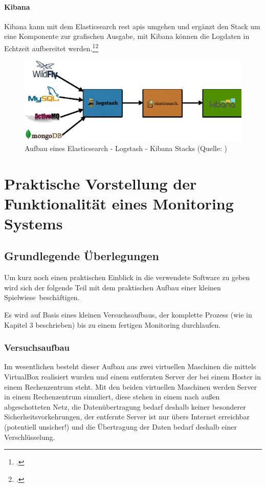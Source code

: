 \documentclass[12pt,a4paper,parskip,listof=totoc,bibliography=totoc]{scrreprt}
\begin{document}
	\subsubsection{Kibana}
	Kibana kann mit dem Elasticsearch \acrshort{rest} \acrshort{api}s umgehen und ergänzt den Stack um eine Komponente zur grafischen Ausgabe, mit Kibana können die Logdaten in Echtzeit aufbereitet werden.\footcite{kibana}\footcite{elk2015}
	\begin{figure}[h!]
		\centering
		\includegraphics[width=1\textwidth]{pics/elk-stack.eps}
		\caption[Aufbau eines Elasticsearch - Logstash - Kibana Stacks]{Aufbau eines Elasticsearch - Logstash - Kibana Stacks (Quelle: \textcite{elkstackpic})}
		\label{fig:elk}
	\end{figure}
	\clearpage
	
	\chapter{Praktische Vorstellung der Funktionalität eines Monitoring Systems}
	\section{Grundlegende Überlegungen}
	Um kurz noch einen praktischen Einblick in die verwendete Software zu geben wird sich der folgende Teil mit dem praktischen Aufbau einer kleinen \glqq Spielwiese\grqq\ beschäftigen. 
	
	Es wird auf Basis eines kleinen Versuchsaufbaus, der komplette Prozess (wie in Kapitel 3 beschrieben) bis zu einem fertigen Monitoring durchlaufen.
	\subsection{Versuchsaufbau}
	Im wesentlichen besteht dieser Aufbau aus zwei virtuellen Maschinen die mittels VirtualBox realisiert wurden und einem entfernten Server der bei einem Hoster in einem Rechenzentrum steht. Mit den beiden virtuellen Maschinen werden Server in einem Rechenzentrum simuliert, diese stehen in einem nach außen abgeschotteten Netz, die Datenübertragung bedarf deshalb keiner besonderer Sicherheitsvorkehrungen, der entfernte Server ist nur übers Internet erreichbar (potentiell unsicher!) und die Übertragung der Daten bedarf deshalb einer Verschlüsselung.
\end{document}
